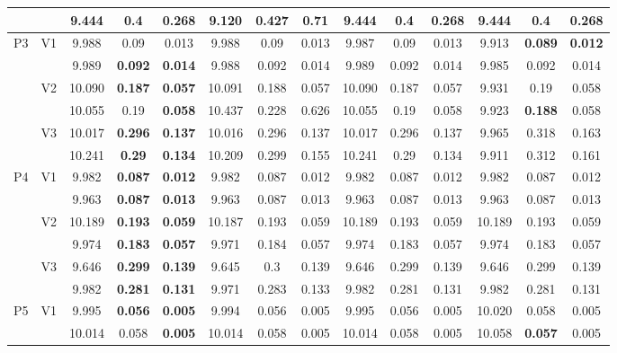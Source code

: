 \documentclass[12pt,a4paper]{article}
\begin{document}
\begin{sidewaystable}[ht]
{\begin{tabular}{cc|ccc|ccc|ccc|ccc|}
   &  & 9.444 & \textbf{0.4} & \textbf{0.268} & 9.120 & 0.427 & 0.71 & 9.444 & 0.4 & 0.268 & 9.444 & 0.4 & 0.268 \\ 
   \hline \hline\multirow{6}{*}{P3} & \multirow{2}{*}{V1} & 9.988 & 0.09 & 0.013 & 9.988 & 0.09 & 0.013 & 9.987 & 0.09 & 0.013 & 9.913 & \textbf{0.089} & \textbf{0.012} \\ 
   &  & 9.989 & \textbf{0.092} & \textbf{0.014} & 9.988 & 0.092 & 0.014 & 9.989 & 0.092 & 0.014 & 9.985 & 0.092 & 0.014 \\ 
   & \multirow{2}{*}{V2} & 10.090 & \textbf{0.187} & \textbf{0.057} & 10.091 & 0.188 & 0.057 & 10.090 & 0.187 & 0.057 & 9.931 & 0.19 & 0.058 \\ 
   &  & 10.055 & 0.19 & \textbf{0.058} & 10.437 & 0.228 & 0.626 & 10.055 & 0.19 & 0.058 & 9.923 & \textbf{0.188} & 0.058 \\ 
   & \multirow{2}{*}{V3} & 10.017 & \textbf{0.296} & \textbf{0.137} & 10.016 & 0.296 & 0.137 & 10.017 & 0.296 & 0.137 & 9.965 & 0.318 & 0.163 \\ 
   &  & 10.241 & \textbf{0.29} & \textbf{0.134} & 10.209 & 0.299 & 0.155 & 10.241 & 0.29 & 0.134 & 9.911 & 0.312 & 0.161 \\ 
   \hline \hline\multirow{6}{*}{P4} & \multirow{2}{*}{V1} & 9.982 & \textbf{0.087} & \textbf{0.012} & 9.982 & 0.087 & 0.012 & 9.982 & 0.087 & 0.012 & 9.982 & 0.087 & 0.012 \\ 
   &  & 9.963 & \textbf{0.087} & \textbf{0.013} & 9.963 & 0.087 & 0.013 & 9.963 & 0.087 & 0.013 & 9.963 & 0.087 & 0.013 \\ 
   & \multirow{2}{*}{V2} & 10.189 & \textbf{0.193} & \textbf{0.059} & 10.187 & 0.193 & 0.059 & 10.189 & 0.193 & 0.059 & 10.189 & 0.193 & 0.059 \\ 
   &  & 9.974 & \textbf{0.183} & \textbf{0.057} & 9.971 & 0.184 & 0.057 & 9.974 & 0.183 & 0.057 & 9.974 & 0.183 & 0.057 \\ 
   & \multirow{2}{*}{V3} & 9.646 & \textbf{0.299} & \textbf{0.139} & 9.645 & 0.3 & 0.139 & 9.646 & 0.299 & 0.139 & 9.646 & 0.299 & 0.139 \\ 
   &  & 9.982 & \textbf{0.281} & \textbf{0.131} & 9.971 & 0.283 & 0.133 & 9.982 & 0.281 & 0.131 & 9.982 & 0.281 & 0.131 \\ 
   \hline \hline\multirow{6}{*}{P5} & \multirow{2}{*}{V1} & 9.995 & \textbf{0.056} & \textbf{0.005} & 9.994 & 0.056 & 0.005 & 9.995 & 0.056 & 0.005 & 10.020 & 0.058 & 0.005 \\ 
   &  & 10.014 & 0.058 & \textbf{0.005} & 10.014 & 0.058 & 0.005 & 10.014 & 0.058 & 0.005 & 10.058 & \textbf{0.057} & 0.005 \\ 

\end{tabular}}
\end{sidewaystable}
\end{document}
